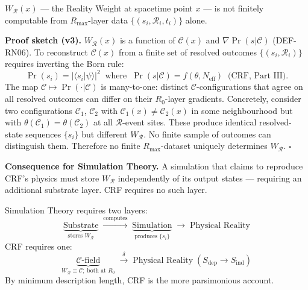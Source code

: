 \documentclass[12pt, a4paper]{article}
\begin{document}
\begin{keybox}[title={CLM-RN04: Uncomputability of Reality Weight
(v2, with proof sketch added in v3)}]
$W_{\mathcal{R}}(x)$ --- the Reality Weight at spacetime point $x$
--- is not finitely computable from $R_{\max}$-layer data
$\{(s_i, \mathcal{R}_i, t_i)\}$ alone.

\medskip
\textbf{Proof sketch (v3).} $W_{\mathcal{R}}(x)$ is a function of
$\mathcal{C}(x)$ and $\nabla\Pr(s|\mathcal{C})$ (DEF-RN06). To
reconstruct $\mathcal{C}(x)$ from a finite set of resolved outcomes
$\{(s_i, \mathcal{R}_i)\}$ requires inverting the Born rule:
\[
  \Pr(s_i) = |\langle s_i | \psi \rangle|^2
  \;\;\text{where}\;\;
  \Pr(s|\mathcal{C}) = f(\theta, N_{\mathrm{eff}})
  \;\;\text{(CRF, Part III)}.
\]
The map $\mathcal{C} \mapsto \Pr(\cdot|\mathcal{C})$ is
many-to-one: distinct $\mathcal{C}$-configurations that agree on
all resolved outcomes can differ on their $R_0$-layer gradients.
Concretely, consider two configurations $\mathcal{C}_1$,
$\mathcal{C}_2$ with $\mathcal{C}_1(x) \neq \mathcal{C}_2(x)$ in
some neighbourhood but with $\theta(\mathcal{C}_1) =
\theta(\mathcal{C}_2)$ at all $\mathcal{R}$-event sites. These
produce identical resolved-state sequences $\{s_i\}$ but different
$W_{\mathcal{R}}$. No finite sample of outcomes can distinguish
them. Therefore no finite $R_{\max}$-dataset uniquely determines
$W_{\mathcal{R}}$. \hfill $\square$

\medskip
\textbf{Consequence for Simulation Theory.} A simulation that
claims to reproduce CRF's physics must store $W_{\mathcal{R}}$
independently of its output states --- requiring an additional
substrate layer. CRF requires no such layer.
\end{keybox}

\begin{derivedbox}[title={FIND-RN03: CRF is computationally more
parsimonious than Simulation Theory}]
Simulation Theory requires two layers:
\[
  \underbrace{\text{Substrate}}_{\text{stores }W_{\mathcal{R}}}
  \;\xrightarrow{\text{computes}}\;
  \underbrace{\text{Simulation}}_{\text{produces }\{s_i\}}
  \;\to\; \text{Physical Reality}
\]
CRF requires one:
\[
  \underbrace{\mathcal{C}\text{-field}}_
  {W_{\mathcal{R}} \equiv \mathcal{C};\;\text{both at }R_0}
  \;\xrightarrow{\delta}\;
  \text{Physical Reality}\;
  (S_{\mathrm{dep}} \to S_{\mathrm{ind}})
\]
By minimum description length, CRF is the more parsimonious account.
\end{derivedbox}

\end{document}
